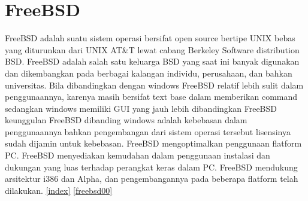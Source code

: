 \section{FreeBSD}
	FreeBSD adalah suatu sistem operasi bersifat open source bertipe UNIX bebas yang diturunkan dari UNIX AT\&T lewat cabang Berkeley Software distribution
	BSD. FreeBSD adalah salah satu keluarga BSD yang saat ini banyak digunakan dan dikembangkan pada berbagai kalangan individu,
	perusahaan, dan bahkan universitas. Bila dibandingkan dengan windows FreeBSD relatif lebih sulit dalam penggunaannya, karenya masih bersifat text base
	dalam memberikan command sedangkan windows memiliki GUI yang jauh lebih dibandingkan FreeBSD keunggulan FreeBSD dibanding windows
	adalah kebebasan dalam penggunaannya bahkan pengembangan dari sistem operasi tersebut lisensinya sudah dijamin untuk kebebasan.
	FreeBSD mengoptimalkan penggunaan flatform PC. FreeBSD menyediakan kemudahan dalam penggunaan instalasi dan dukungan yang luas terhadap perangkat keras dalam PC.
	FreeBSD mendukung arsitektur i386 dan Alpha, dan pengembangannya pada beberapa flatform telah dilakukan. \ref{index} \label{index} 
	\ref{freebsd00} \label{freebsd00}
